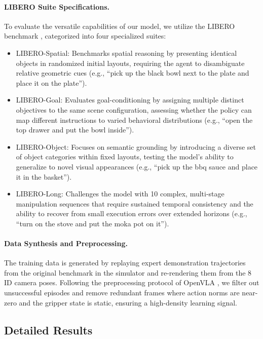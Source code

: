 \paragraph{LIBERO Suite Specifications.} 
To evaluate the versatile capabilities of our model, we utilize the LIBERO benchmark \cite{liu2023libero}, categorized into four specialized suites:
\begin{itemize} [itemsep=0.3em, topsep=0.5em]
    \item LIBERO-Spatial: Benchmarks spatial reasoning by presenting identical objects in randomized initial layouts, requiring the agent to disambiguate relative geometric cues (e.g., ``pick up the black bowl next to the plate and place it on the plate'').
    \item LIBERO-Goal: Evaluates goal-conditioning by assigning multiple distinct objectives to the same scene configuration, assessing whether the policy can map different instructions to varied behavioral distributions (e.g., ``open the top drawer and put the bowl inside'').
    \item LIBERO-Object: Focuses on semantic grounding by introducing a diverse set of object categories within fixed layouts, testing the model's ability to generalize to novel visual appearances (e.g., ``pick up the bbq sauce and place it in the basket'').
    \item LIBERO-Long: Challenges the model with 10 complex, multi-stage manipulation sequences that require sustained temporal consistency and the ability to recover from small execution errors over extended horizons (e.g., ``turn on the stove and put the moka pot on it'').
\end{itemize}




\paragraph{Data Synthesis and Preprocessing.} 
The training data is generated by replaying expert demonstration trajectories from the original benchmark in the simulator and re-rendering them from the 8 ID camera poses. Following the preprocessing protocol of OpenVLA \cite{openvla}, we filter out unsuccessful episodes and remove redundant frames where action norms are near-zero and the gripper state is static, ensuring a high-density learning signal.





\subsection{Detailed Results}

